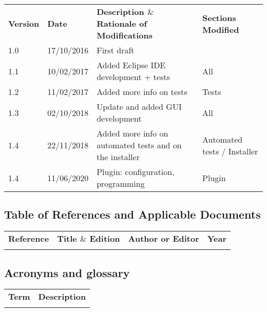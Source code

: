 \documentclass[12pt]{article}
\begin{document}
\begin{table}[H]
\large
\centering
\begin{adjustbox}{width=\textwidth}
\begin{tabular}{ |p{1.5cm}|p{2.5cm}|p{9.0cm}|p{3.0cm}| }
\hhline{----}
\textbf{Version} & \textbf{Date} & \textbf{Description  $  \&  $  Rationale of
Modifications} & \textbf{Sections Modified} \\
\hhline{----}
1.0 & 17/10/2016 & First draft &  \\ 
1.1 & 10/02/2017 & Added Eclipse IDE development + tests & All \\ 
1.2 & 11/02/2017 & Added more info on tests & Tests \\ 
1.3 & 02/10/2018 & Update and added GUI development & All\\
1.4 & 22/11/2018 & Added more info on automated tests and on the installer & Automated tests / Installer \\
1.4 & 11/06/2020 & Plugin: configuration, programming & Plugin \\
\hline
\end{tabular}
\end{adjustbox}
\end{table}

\subsection{Table of References and Applicable Documents}

\begin{table}[H]
\large
\centering
\begin{adjustbox}{width=\textwidth}
\begin{tabular}{ |p{2.66in}|p{2.66in}|p{0.95in}|p{0.43in}| }
\hhline{----}
\textbf{Reference} & \textbf{Title  $  \&  $  Edition} & \textbf{Author or
Editor} & \textbf{Year}
\\
\hhline{----}
 &  &  &  \\ 
\hline
\end{tabular}
\end{adjustbox}
\end{table}

\subsection{Acronyms and glossary}

\begin{table}[H]
\large
\centering
\begin{adjustbox}{width=\textwidth}
\begin{tabular}{ |p{1.24in}|p{5.45in}| }
\hhline{--}
\textbf{Term} & \textbf{Description} \\ 
\hhline{--}
 &  \\ 
\hline
\end{tabular}
\end{adjustbox}
\end{table}
\end{document}
